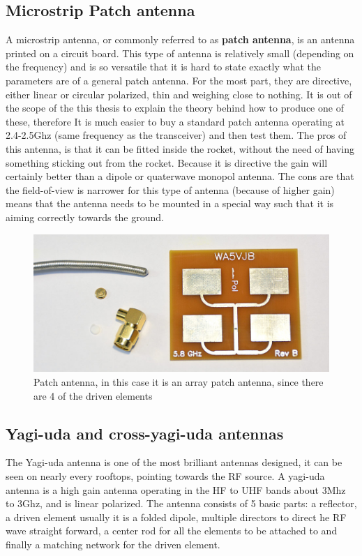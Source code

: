 \subsection{Microstrip Patch antenna}
A microstrip antenna, or commonly referred to as \textbf{patch antenna}, is an antenna printed on a circuit board. This type of antenna is relatively small (depending on the frequency) and is so versatile that it is hard to state exactly what the parameters are of a general patch antenna. For the most part, they are directive, either linear or circular polarized, thin and weighing close to nothing. It is out of the scope of the this thesis to explain the theory behind how to produce one of these, therefore It is much easier to buy a standard patch antenna operating at 2.4-2.5Ghz (same frequency as the transceiver) and then test them. The pros of this antenna, is that it can be fitted inside the rocket, without the need of having something sticking out from the rocket. Because it is directive the gain will certainly better than a dipole or quaterwave monopol antenna. The cons are that the field-of-view is narrower for this type of antenna (because of higher gain) means that the antenna needs to be mounted in a special way such that it is aiming correctly towards the ground.  

\begin{figure}[h]
\centering
\includegraphics[scale=0.5]{figures/PatchAntenna.jpg}
\caption{Patch antenna, in this case it is an array patch antenna, since there are 4 of the driven elements\cite{PatchAntenna}}
\end{figure}

\subsection{Yagi-uda and cross-yagi-uda antennas}
The Yagi-uda antenna is one of the most brilliant antennas designed, it can be seen on nearly every rooftops, pointing towards the RF source. A yagi-uda antenna is a high gain antenna operating in the HF to UHF bands about 3Mhz to 3Ghz, and is linear polarized. The antenna consists of 5 basic parts: a reflector, a driven element usually it is a folded dipole, multiple directors to direct he RF wave straight forward, a center rod for all the elements to be attached to and finally a matching network for the driven element.

